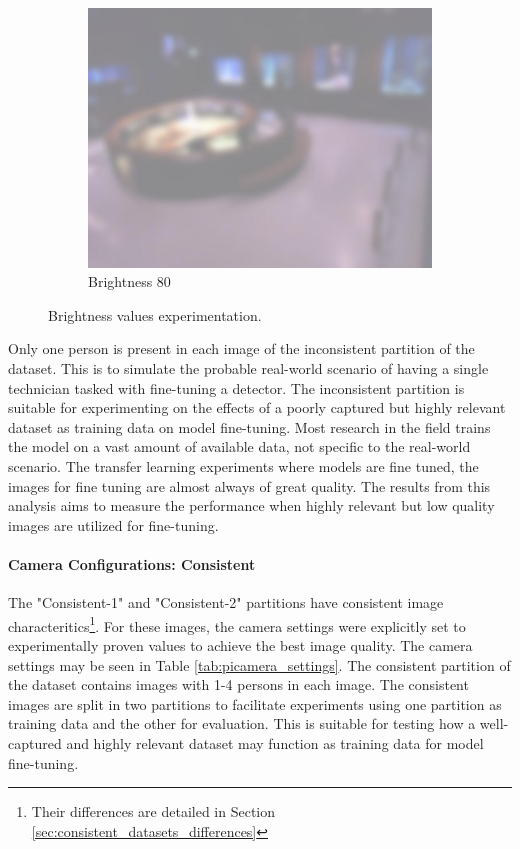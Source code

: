 \begin{figure}[H]
\begin{subfigure}{0.32\textwidth}
        \centering
        \includegraphics[width=\textwidth]{Images/DeviceImages/1st-iteration/hallvard-090224-132210-0-bright80.jpg}
        \caption{Brightness 80}
    \end{subfigure}
    \caption{Brightness values experimentation.}
    \label{fig:brightness_experimentation}
\end{figure}

Only one person is present in each image of the inconsistent partition of the dataset. This is to simulate the probable real-world scenario of having a single technician tasked with fine-tuning a detector. The inconsistent partition is suitable for experimenting on the effects of a poorly captured but highly relevant dataset as training data on model fine-tuning. Most research in the field trains the model on a vast amount of available data, not specific to the real-world scenario. The transfer learning experiments where models are fine tuned, the images for fine tuning are almost always of great quality. The results from this analysis aims to measure the performance when highly relevant but low quality images are utilized for fine-tuning.

\paragraph{Camera Configurations: Consistent}
The "Consistent-1" and "Consistent-2" partitions have consistent image characteritics\footnote{Their differences are detailed in Section \ref{sec:consistent_datasets_differences}}. For these images, the camera settings were explicitly set to experimentally proven values to achieve the best image quality. The camera settings may be seen in Table \ref{tab:picamera_settings}. The consistent partition of the dataset contains images with 1-4 persons in each image. The consistent images are split in two partitions to facilitate experiments using one partition as training data and the other for evaluation. This is suitable for testing how a well-captured and highly relevant dataset may function as training data for model fine-tuning. 

